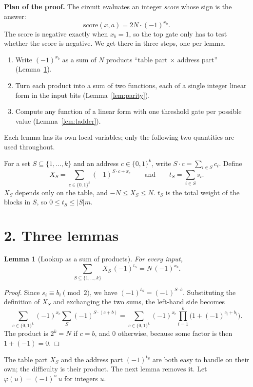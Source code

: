 \documentclass[11pt,letterpaper]{article}
\newtheorem{lemma}{Lemma}
\newcommand{\bits}{\{0,1\}}
\newcommand{\sect}[1]{\section*{\color{ink}#1}}
\newcommand{\smalltitle}[1]{\textbf{\color{ink}#1}\quad}
\begin{document}
\smalltitle{Plan of the proof.}
The circuit evaluates an integer \emph{score} whose sign is the answer:
\begin{equation}\label{eq:goal}
\text{score}(x,a)=2N\cdot(-1)^{x_b}.
\end{equation}
The score is negative exactly when $x_b=1$, so the top gate only has to test
whether the score is negative. We get there in three steps, one per lemma.
\begin{enumerate}
\item Write $(-1)^{x_b}$ as a sum of $N$ products ``table part $\times$
      address part'' (Lemma~\ref{lem:lookup}).
\item Turn each product into a sum of two functions, each of a single
      integer linear form in the input bits (Lemma~\ref{lem:parity}).
\item Compute any function of a linear form with one threshold gate per
      possible value (Lemma~\ref{lem:ladder}).
\end{enumerate}
Each lemma has its own local variables; only the following two quantities
are used throughout.

\begin{keybox}
For a set $S\subseteq\{1,\dots,k\}$ and an address $c\in\bits^k$, write
$S\cdot c=\sum_{i\in S}c_i$. Define
\[
X_S=\sum_{c\in\bits^k}(-1)^{S\cdot c+x_c}
\qquad\text{and}\qquad
t_S=\sum_{i\in S}s_i .
\]
$X_S$ depends only on the table, and $-N\le X_S\le N$.
$t_S$ is the total weight of the blocks in $S$, so $0\le t_S\le |S|m$.
\end{keybox}

\sect{2. Three lemmas}

\begin{lemma}[Lookup as a sum of products]\label{lem:lookup}
For every input,
\[
\sum_{S\subseteq\{1,\dots,k\}}X_S\,(-1)^{t_S}=N\,(-1)^{x_b}.
\]
\end{lemma}
\begin{proof}
Since $s_i\equiv b_i\pmod 2$, we have $(-1)^{t_S}=(-1)^{S\cdot b}$.
Substituting the definition of $X_S$ and exchanging the two sums, the
left-hand side becomes
\[
\sum_{c\in\bits^k}(-1)^{x_c}\sum_{S}(-1)^{S\cdot(c+b)}
=\sum_{c\in\bits^k}(-1)^{x_c}\prod_{i=1}^{k}\bigl(1+(-1)^{c_i+b_i}\bigr).
\]
The product is $2^k=N$ if $c=b$, and $0$ otherwise, because some factor
is then $1+(-1)=0$.
\end{proof}

The table part $X_S$ and the address part $(-1)^{t_S}$ are both easy to
handle on their own; the difficulty is their product. The next lemma
removes it. Let $\varphi(u)=(-1)^u\,u$ for integers $u$.
\end{document}
